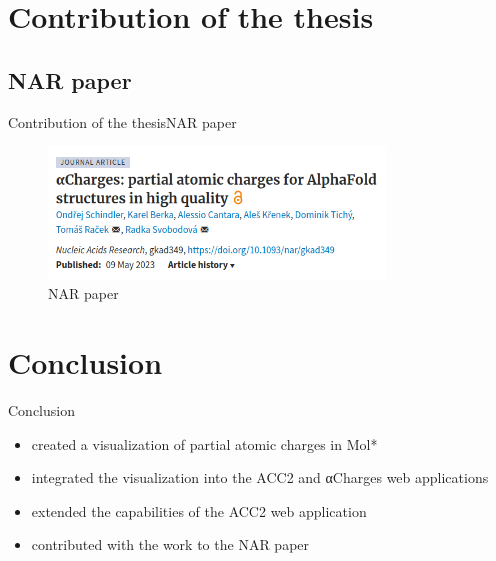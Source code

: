 \documentclass[
]{beamer}
\begin{document}
\section[Contribution of the thesis]{Contribution of the thesis}

\subsection[NAR paper]{NAR paper}

\begin{frame}{Contribution of the thesis}{NAR paper}
\begin{figure}
  \includegraphics[width=0.8\textwidth,keepaspectratio]{images/paper.png}
  \caption{NAR paper \cite{schindler2023acharges}}
\end{figure}
\end{frame}

\section{Conclusion}

\begin{frame}{Conclusion}
  \begin{itemize}
    \item created a visualization of partial atomic charges in Mol*
    \item integrated the visualization into the ACC2 and αCharges web applications
    \item extended the capabilities of the ACC2 web application
    \item contributed with the work to the NAR paper
  \end{itemize}
\end{frame}
  
\section{\bibname}
\begin{frame}[t, allowframebreaks]{\bibname}
\printbibliography[heading=none]
\end{frame}


\makeoutro
\end{document}
